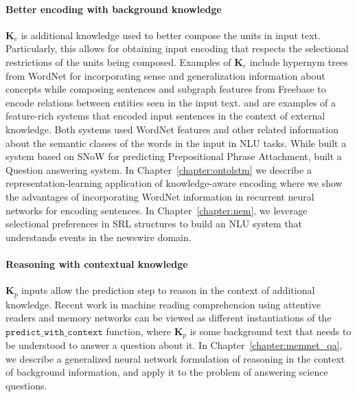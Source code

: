 \paragraph{Better encoding with background knowledge}
$\mathbf{K}_e$ is additional knowledge used to better compose the units in input text. Particularly, this allows for
obtaining input encoding that respects the selectional restrictions of the units being composed.
Examples of $\mathbf{K}_e$ include hypernym trees from WordNet for
incorporating sense and generalization information about concepts while composing sentences and subgraph features from Freebase to encode relations
between entities seen in the input text. \cite{moldovan2001logic} and \cite{krymolowski1998incorporating} are examples of a feature-rich systems that encoded input sentences in the 
context of external knowledge. Both systems used WordNet features and other related information about the semantic classes of the words in the input in NLU tasks. While \cite{krymolowski1998incorporating} 
built a system based on SNoW \cite{CCRR99} for predicting Prepositional Phrase Attachment, \cite{moldovan2001logic} built a Question answering system. In Chapter~\ref{chapter:ontolstm} we describe
a representation-learning application of knowledge-aware encoding where we show the advantages of incorporating WordNet information in recurrent neural networks for encoding sentences. In Chapter~\ref{chapter:nem},
we leverage selectional preferences in SRL structures to build an NLU system that understands events in the newswire domain.

\paragraph{Reasoning with contextual knowledge}
$\textbf{K}_p$ inputs allow the prediction step to reason in the context of additional knowledge.
Recent work in machine reading comprehension using 
attentive readers \cite{hermann2015teaching} and memory networks \cite{weston2014memory,Sukhbaatar2015EndToEndMN,Xiong2016DynamicMN} can be viewed as different instantiations
of the $\mathtt{predict\_with\_context}$ function, where $\textbf{K}_p$ is some background text that needs to be understood to answer a question about it. 
In Chapter~\ref{chapter:memnet_qa}, we describe a generalized neural network formulation of reasoning in the context of background information,
and apply it to the problem of answering science questions.

